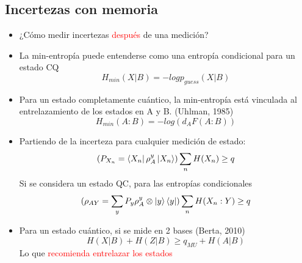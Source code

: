 \documentclass{book}
\begin{document}
\subsection{Incertezas con memoria}
\begin{itemize}
\item ¿Cómo medir incertezas \textcolor{red}{después} de una medición?
\item La min-entropía puede entenderse como una entropía condicional para un estado CQ
\begin{equation} \label{eq4.14} H_{min} (X|B) = - log p_{guess} (X|B) \end{equation}
\item Para un estado completamente cuántico, la min-entropía está vinculada al entrelazamiento de los estados en A y B. (Uhlman, 1985)
\begin{equation} \label{eq15} H_{min} (A:B) = - log(d_A F(A:B)) \end{equation}
\item Partiendo de la incerteza para cualquier medición de estado:
\begin{equation} \label{eq16} (P_{X_n}=\bra{X_n}\rho_A^y\ket{X_n} ) \sum_n H(X_n) \geq q \end{equation}
Si se considera un estado QC, para las entropías condicionales
\begin{equation} \label{eq17} (\rho_{AY}=\sum_y P_y \rho_A^y\otimes\ket{y} \bra{y}) \sum_n H(X_n:Y) \geq q \end{equation}
\item Para un estado cuántico, si se mide en 2 bases (Berta, 2010)
\begin{equation} \label{eq18} H(X|B) + H(Z|B) \geq q_{MU} +H(A|B) \end{equation}
Lo que \textcolor{red}{recomienda entrelazar los estados}
\end{itemize}
\end{document}
